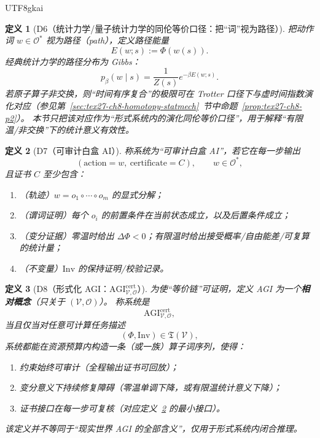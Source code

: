 \documentclass[12pt]{article}
\newtheorem{definition}{定义}[section]
\begin{document}
\begin{CJK*}{UTF8}{gkai}
\begin{definition}[D6（统计力学/量子统计力学的同伦等价口径：把“词”视为路径）]
\label{def:tex27-ch9-d6}
把动作词 $w\in\mathcal{O}^*$ 视为路径（path），定义路径能量
\[
  E(w;s):=\Phi(w(s)).
\]
经典统计力学的路径分布为 Gibbs：
\[
  p_\beta(w\mid s)=\frac{1}{Z(s)}e^{-\beta E(w;s)}.
\]
若原子算子非交换，则“时间有序复合”的极限可在 Trotter 口径下与虚时间指数演化对应（参见第~\ref{sec:tex27-ch8-homotopy-statmech}~节中命题~\ref{prop:tex27-ch8-p2}）。
本节只把该对应作为“形式系统内的演化同伦等价口径”，用于解释“有限温/非交换”下的统计意义有效性。
\end{definition}

\begin{definition}[D7（可审计白盒 AI）]
\label{def:tex27-ch9-d7}
称系统为“可审计白盒 AI”，若它在每一步输出
\[
  (\text{action}=w,\ \text{certificate}=C),
  \qquad
  w\in\mathcal{O}^*,
\]
且证书 $C$ 至少包含：
\begin{enumerate}
  \item（轨迹）$w=o_1\circ\cdots\circ o_m$ 的显式分解；
  \item（谓词证明）每个 $o_i$ 的前置条件在当前状态成立，以及后置条件成立；
  \item（变分证据）零温时给出 $\Delta\Phi<0$；有限温时给出接受概率/自由能差/可复算的统计量；
  \item（不变量）$\mathrm{Inv}$ 的保持证明/校验记录。
\end{enumerate}
\end{definition}

\begin{definition}[D8（形式化 AGI：$\mathrm{AGI}^{\mathrm{cert}}_{\mathcal{V},\mathcal{O}}$）]
\label{def:tex27-ch9-d8}
为使“等价链”可证明，定义 AGI 为一个\textbf{相对概念}（只关于 $(\mathcal{V},\mathcal{O})$）。
称系统是
\[
  \mathrm{AGI}^{\mathrm{cert}}_{\mathcal{V},\mathcal{O}},
\]
当且仅当对任意可计算任务描述
\[
  (\Phi,\mathrm{Inv})\in\mathfrak{T}(\mathcal{V}),
\]
系统都能在资源预算内构造一条（或一族）算子词序列，使得：
\begin{enumerate}
  \item 约束始终可审计（全程输出证书可回放）；
  \item 变分意义下持续修复障碍（零温单调下降，或有限温统计意义下降）；
  \item 证书接口在每一步可复核（对应定义~\ref{def:tex27-ch9-d7} 的最小接口）。
\end{enumerate}
该定义并不等同于“现实世界 AGI 的全部含义”，仅用于形式系统内闭合推理。
\end{definition}


\end{CJK*}
\end{document}
